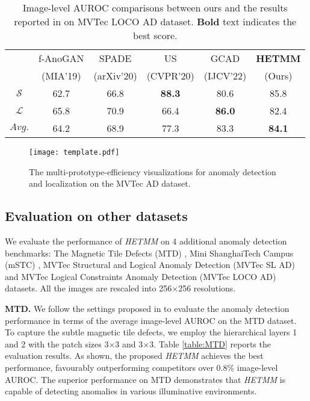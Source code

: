 \documentclass[default,iicol]{sn-jnl}\usepackage[algo2e,ruled,linesnumbered]{algorithm2e}
\theoremstyle{thmstyleone}\newtheorem{theorem}{Theorem}\newtheorem{proposition}[theorem]{Proposition}
\theoremstyle{thmstyletwo}\newtheorem{example}{Example}\newtheorem{remark}{Remark}
\theoremstyle{thmstylethree}\newtheorem{definition}{Definition}
\begin{document}
\begin{table}[!t]
    \caption{
    Image-level AUROC comparisons between ours and the results reported in \cite{MVTECLOCO} on MVTec LOCO AD dataset.
    \textbf{Bold} text indicates the best score.
    }
    \tiny
    \centering
    \setlength{\tabcolsep}{0.7mm}
    \begin{tabular}{c|ccccc}
        \hline
        \multirow{2}{*}{} &f-AnoGAN\cite{F-AnoGan} &SPADE\cite{SPADE}  &US\cite{US}   &GCAD\cite{MVTECLOCO}  &\textbf{HETMM}  \\
                                    &(MIA'19)                &(arXiv'20)         &(CVPR'20)     &(IJCV'22)        &(Ours)\\\hline
        $\mathcal{S}$                 &62.7                   &66.8              &\textbf{88.3}         &80.6            &85.8  \\
        $\mathcal{L}$                 &65.8                   &70.9              &66.4         &\textbf{86.0}             &82.4  \\\hline
        $Avg.$                        &64.2                   &68.9              &77.3         &83.3            &\textbf{84.1}  \\\hline
    \end{tabular}
    \label{table:MVTECLOCO}
\end{table}

\begin{figure*}[!t]
    \centering
    \texttt{[image: template.pdf]}
    \caption{
    The multi-prototype-efficiency visualizations for anomaly detection and localization on the MVTec AD dataset.
    }
    \label{fig:template}
\end{figure*}

\subsection{Evaluation on other datasets} \label{EXP:Others}
We evaluate the performance of \textit{HETMM} on 4 additional anomaly detection benchmarks: The Magnetic Tile Defects (MTD) \cite{MTD}, Mini ShanghaiTech Campus (mSTC) \cite{mSTC}, MVTec Structural and Logical Anomaly Detection (MVTec SL AD) \cite{MVTECLOCO} and MVTec Logical Constraints Anomaly Detection (MVTec LOCO AD) \cite{MVTECLOCO} datasets.
All the images are rescaled into 256$\times$256 resolutions.

\noindent\textbf{MTD. }
We follow the settings proposed in \cite{DifferNet} to evaluate the anomaly detection performance in terms of the average image-level AUROC on the MTD dataset.
To capture the subtle magnetic tile defects, we employ the hierarchical layers 1 and 2 with the patch sizes 3$\times$3 and 3$\times$3.
Table \ref{table:MTD} reports the evaluation results.
As shown, the proposed \textit{HETMM} achieves the best performance, favourably outperforming competitors over 0.8\% image-level AUROC.
The superior performance on MTD demonstrates that \textit{HETMM} is capable of detecting anomalies in various illuminative environments.
\end{document}

